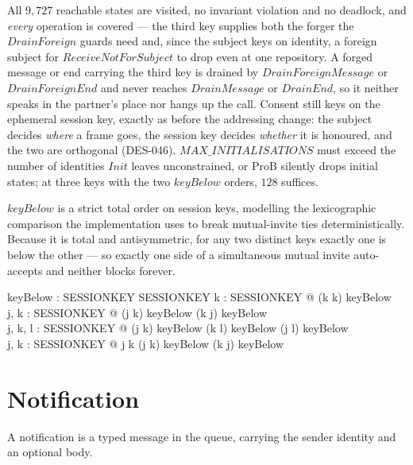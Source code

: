 \documentclass[a4paper,10pt,fleqn]{article}
\begin{document}
All $9{,}727$ reachable states are visited, no invariant violation and
no deadlock, and \emph{every} operation is covered --- the third key
supplies both the forger the $DrainForeign$ guards need and, since the
subject keys on identity, a foreign subject for $ReceiveNotForSubject$
to drop even at one repository.  A forged message or end carrying the
third key is drained by $DrainForeignMessage$ or $DrainForeignEnd$ and
never reaches $DrainMessage$ or $DrainEnd$, so it neither speaks in the
partner's place nor hangs up the call.  Consent still keys on the
ephemeral session key, exactly as before the addressing change: the
subject decides \emph{where} a frame goes, the session key decides
\emph{whether} it is honoured, and the two are orthogonal (DES-046).
$MAX\_INITIALISATIONS$ must exceed the number of identities $Init$ leaves
unconstrained, or ProB silently drops initial states; at three keys with
the two $keyBelow$ orders, $128$ suffices.

$keyBelow$ is a strict total order on session keys, modelling the
lexicographic comparison the implementation uses to break mutual-invite
ties deterministically.  Because it is total and antisymmetric, for any
two distinct keys exactly one is below the other --- so exactly one side
of a simultaneous mutual invite auto-accepts and neither blocks forever.

\begin{axdef}
  keyBelow : SESSIONKEY \rel SESSIONKEY
\where
  \forall k : SESSIONKEY @ (k \mapsto k) \notin keyBelow \\
  \forall j, k : SESSIONKEY @
    (j \mapsto k) \in keyBelow \implies (k \mapsto j) \notin keyBelow \\
  \forall j, k, l : SESSIONKEY @
    (j \mapsto k) \in keyBelow \land (k \mapsto l) \in keyBelow
      \implies (j \mapsto l) \in keyBelow \\
  \forall j, k : SESSIONKEY @
    j \neq k \implies (j \mapsto k) \in keyBelow \lor (k \mapsto j) \in keyBelow
\end{axdef}

\section{Notification}

A notification is a typed message in the queue, carrying the sender
identity and an optional body.
\end{document}
